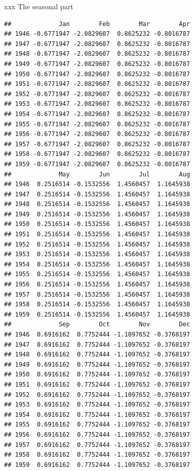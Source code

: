\documentclass[ignorenonframetext,]{beamer}
\begin{document}
\begin{frame}[fragile]{xxx The seasonal part}
\begin{verbatim}
##             Jan        Feb        Mar        Apr
## 1946 -0.6771947 -2.0829607  0.8625232 -0.8016787
## 1947 -0.6771947 -2.0829607  0.8625232 -0.8016787
## 1948 -0.6771947 -2.0829607  0.8625232 -0.8016787
## 1949 -0.6771947 -2.0829607  0.8625232 -0.8016787
## 1950 -0.6771947 -2.0829607  0.8625232 -0.8016787
## 1951 -0.6771947 -2.0829607  0.8625232 -0.8016787
## 1952 -0.6771947 -2.0829607  0.8625232 -0.8016787
## 1953 -0.6771947 -2.0829607  0.8625232 -0.8016787
## 1954 -0.6771947 -2.0829607  0.8625232 -0.8016787
## 1955 -0.6771947 -2.0829607  0.8625232 -0.8016787
## 1956 -0.6771947 -2.0829607  0.8625232 -0.8016787
## 1957 -0.6771947 -2.0829607  0.8625232 -0.8016787
## 1958 -0.6771947 -2.0829607  0.8625232 -0.8016787
## 1959 -0.6771947 -2.0829607  0.8625232 -0.8016787
##             May        Jun        Jul        Aug
## 1946  0.2516514 -0.1532556  1.4560457  1.1645938
## 1947  0.2516514 -0.1532556  1.4560457  1.1645938
## 1948  0.2516514 -0.1532556  1.4560457  1.1645938
## 1949  0.2516514 -0.1532556  1.4560457  1.1645938
## 1950  0.2516514 -0.1532556  1.4560457  1.1645938
## 1951  0.2516514 -0.1532556  1.4560457  1.1645938
## 1952  0.2516514 -0.1532556  1.4560457  1.1645938
## 1953  0.2516514 -0.1532556  1.4560457  1.1645938
## 1954  0.2516514 -0.1532556  1.4560457  1.1645938
## 1955  0.2516514 -0.1532556  1.4560457  1.1645938
## 1956  0.2516514 -0.1532556  1.4560457  1.1645938
## 1957  0.2516514 -0.1532556  1.4560457  1.1645938
## 1958  0.2516514 -0.1532556  1.4560457  1.1645938
## 1959  0.2516514 -0.1532556  1.4560457  1.1645938
##             Sep        Oct        Nov        Dec
## 1946  0.6916162  0.7752444 -1.1097652 -0.3768197
## 1947  0.6916162  0.7752444 -1.1097652 -0.3768197
## 1948  0.6916162  0.7752444 -1.1097652 -0.3768197
## 1949  0.6916162  0.7752444 -1.1097652 -0.3768197
## 1950  0.6916162  0.7752444 -1.1097652 -0.3768197
## 1951  0.6916162  0.7752444 -1.1097652 -0.3768197
## 1952  0.6916162  0.7752444 -1.1097652 -0.3768197
## 1953  0.6916162  0.7752444 -1.1097652 -0.3768197
## 1954  0.6916162  0.7752444 -1.1097652 -0.3768197
## 1955  0.6916162  0.7752444 -1.1097652 -0.3768197
## 1956  0.6916162  0.7752444 -1.1097652 -0.3768197
## 1957  0.6916162  0.7752444 -1.1097652 -0.3768197
## 1958  0.6916162  0.7752444 -1.1097652 -0.3768197
## 1959  0.6916162  0.7752444 -1.1097652 -0.3768197
\end{verbatim}

\end{frame}
\end{document}
